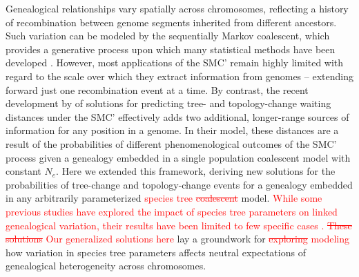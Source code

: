 \documentclass[11pt]{article}
\begin{document}
Genealogical relationships vary spatially across chromosomes, reflecting 
a history of recombination between genome segments inherited from 
different ancestors. Such variation can be modeled by the sequentially 
Markov coalescent, which provides a generative process upon which 
many statistical methods have been developed \citep{mcvean2005approximating, spence_inference_2018}.
% 
However, most applications of the SMC' remain highly limited with regard to 
the scale over which they extract information from genomes -- extending forward 
just one recombination event at a time. 
By contrast, the recent development 
by \citet{deng_distribution_2021}
of solutions for predicting 
tree- and topology-change waiting distances under the SMC' 
effectively adds two additional, longer-range sources of information for 
any position in a genome. 
In their model,
these distances are a 
result of the probabilities of different phenomenological outcomes of the 
SMC' process given a genealogy embedded in a single population coalescent
model with constant $N_e$.
Here we extended this framework, deriving new solutions for the probabilities 
of tree-change and topology-change events for a genealogy embedded 
in any arbitrarily parameterized
\textcolor{red}{species tree \sout{coalescent}} model. 
% 
\textcolor{red}{
While some previous studies have explored the impact of species tree parameters
on linked genealogical variation, their results have been limited to few specific
cases \citep[e.g.,][]{slatkin2006concordance}.
\sout{These solutions} 
Our generalized solutions here
}
lay a groundwork for 
\textcolor{red}{\sout{exploring} modeling}
how variation in species tree parameters 
affects neutral expectations of genealogical heterogeneity across chromosomes.
\end{document}
